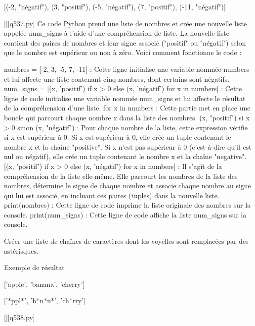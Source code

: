 [(-2, "négatif"), (3, "positif"), (-5, "négatif"), (7, "positif"), (-11, "négatif")]
        \par
        \begin{solution}
            \renewcommand{\nomfichier}{q537.py}
            \pythonfile{\chemincode \nomfichier}[][\nomfichier]
            Ce code Python prend une liste de nombres et crée une nouvelle liste appelée num\_signs à l'aide d'une compréhension de liste. La nouvelle liste contient des paires de nombres et leur signe associé ("positif" ou "négatif") selon que le nombre est supérieur ou non à zéro. Voici comment fonctionne le code :

    nombres = [-2, 3, -5, 7, -11] : Cette ligne initialise une variable nommée numbers et lui affecte une liste contenant cinq nombres, dont certains sont négatifs.
    num\_signs = [(x, 'positif') if x > 0 else (x, 'négatif') for x in numbers] : Cette ligne de code initialise une variable nommée num\_signs et lui affecte le résultat de la compréhension d'une liste.
        for x in numbers : Cette partie met en place une boucle qui parcourt chaque nombre x dans la liste des nombres.
        (x, "positif") si x > 0 sinon (x, "négatif") : Pour chaque nombre de la liste, cette expression vérifie si x est supérieur à 0. Si x est supérieur à 0, elle crée un tuple contenant le nombre x et la chaîne "positive". Si x n'est pas supérieur à 0 (c'est-à-dire qu'il est nul ou négatif), elle crée un tuple contenant le nombre x et la chaîne "negative".
        [(x, 'positif') if x > 0 else (x, 'négatif') for x in numbers] : Il s'agit de la compréhension de la liste elle-même. Elle parcourt les nombres de la liste des nombres, détermine le signe de chaque nombre et associe chaque nombre au signe qui lui est associé, en incluant ces paires (tuples) dans la nouvelle liste.
    print(nombres) : Cette ligne de code imprime la liste originale des nombres sur la console.
    print(num\_signs) : Cette ligne de code affiche la liste num\_signs sur la console.
        \end{solution}
        

        \question
        Créer une liste de chaînes de caractères dont les voyelles sont remplacées par des astérisques.

Exemple de résultat

['apple', 'banana', 'cherry']

['*ppl*', 'b*n*n*', 'ch*rry']
        \par
        \begin{solution}
            \renewcommand{\nomfichier}{q538.py}
            \pythonfile{\chemincode \nomfichier}[][\nomfichier]
            
        \end{solution}
        

